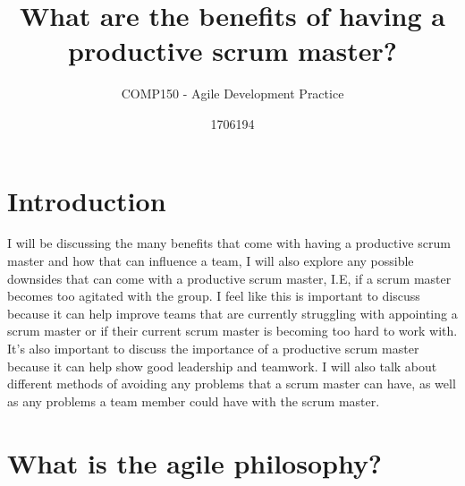 \documentclass{scrartcl}
\title{What are the benefits of having a productive scrum master?}
\subtitle{COMP150 - Agile Development Practice}
\author{1706194}
\begin{document}
\maketitle


\section{Introduction}

I will be discussing the many benefits that come with having a productive scrum master and how that can influence a team, I will also explore any possible downsides that can come with a productive scrum master, I.E, if a scrum master becomes too agitated with the group. I feel like this is important to discuss because it can help improve teams that are currently struggling with appointing a scrum master or if their current scrum master is becoming too hard to work with. It's also important to discuss the importance of a productive scrum master because it can help show good leadership and teamwork. I will also talk about different methods of avoiding any problems that a scrum master can have, as well as any problems a team member could have with the scrum master. 

\section {What is the agile philosophy?}
\end{document}
